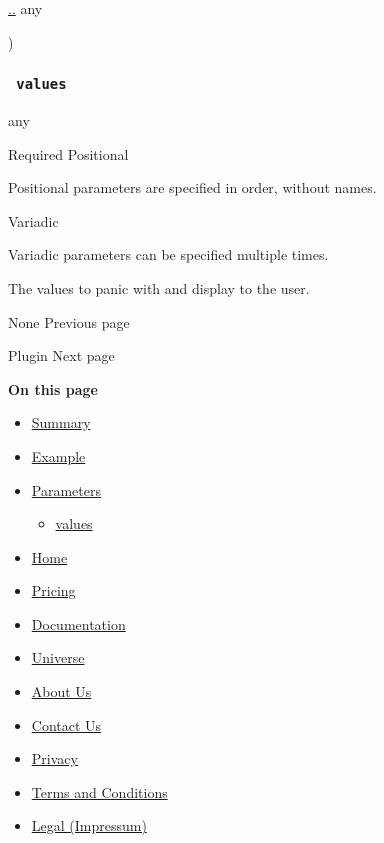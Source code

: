 { \hyperref[parameters-values]{..} { any } }

)

\subsubsection{\texorpdfstring{\texttt{\ values\ }}{ values }}\label{parameters-values}

{ any }

{Required} {{ Positional }}

\label{parameters-values-positional-tooltip}
Positional parameters are specified in order, without names.

{{ Variadic }}

\label{parameters-values-variadic-tooltip}
Variadic parameters can be specified multiple times.

The values to panic with and display to the user.

\href{/docs/reference/foundations/none/}{\pandocbounded{}}

{ None } { Previous page }

\href{/docs/reference/foundations/plugin/}{\pandocbounded{}}

{ Plugin } { Next page }

\textbf{On this page}

\begin{itemize}
\tightlist
\item
  \hyperref[summary]{Summary}
\item
  \hyperref[example]{Example}
\item
  \hyperref[parameters]{Parameters}

  \begin{itemize}
  \tightlist
  \item
    \hyperref[parameters-values]{values}
  \end{itemize}
\end{itemize}

\begin{itemize}
\tightlist
\item
  \href{/}{Home}
\item
  \href{/pricing/}{Pricing}
\item
  \href{/docs/}{Documentation}
\item
  \href{/universe/}{Universe}
\item
  \href{/about/}{About Us}
\item
  \href{/contact/}{Contact Us}
\item
  \href{/privacy/}{Privacy}
\item
  \href{https://typst.app/terms}{Terms and Conditions}
\item
  \href{/legal/}{Legal (Impressum)}
\end{itemize}

